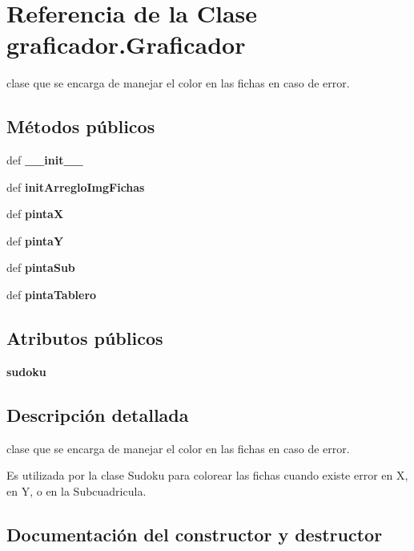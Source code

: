 \section{Referencia de la Clase graficador.\-Graficador}
\label{classgraficador_1_1_graficador}


clase que se encarga de manejar el color en las fichas en caso de error.  


\subsection*{Métodos públicos}
\begin{DoxyCompactItemize}
\item 
def {\bf \-\_\-\-\_\-init\-\_\-\-\_\-}
\item 
def {\bf init\-Arreglo\-Img\-Fichas}
\item 
def {\bf pinta\-X}
\item 
def {\bf pinta\-Y}
\item 
def {\bf pinta\-Sub}
\item 
def {\bf pinta\-Tablero}
\end{DoxyCompactItemize}
\subsection*{Atributos públicos}
\begin{DoxyCompactItemize}
\item 
{\bfseries sudoku}\label{classgraficador_1_1_graficador_ad833c980c323cc0a8f0c5449b6904410}

\end{DoxyCompactItemize}


\subsection{Descripción detallada}
clase que se encarga de manejar el color en las fichas en caso de error. 

Es utilizada por la clase Sudoku para colorear las fichas cuando existe error en X, en Y, o en la Subcuadricula. 

\subsection{Documentación del constructor y destructor}
